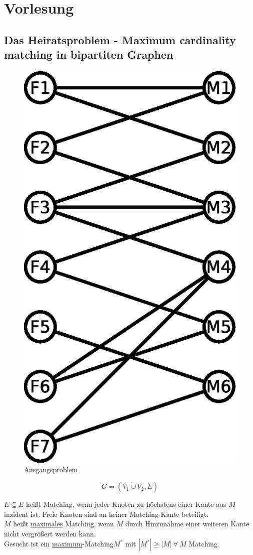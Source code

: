 \chapter{Vorlesung}
\section[Das Heiratsproblem]{Das Heiratsproblem - Maximum cardinality matching in bipartiten Graphen}
\begin{figure}
\centering
\includegraphics[width=0.5\linewidth]{23/Grafik/Diagramm1}
\caption{Ausgangsproblem}
\label{fig:Diagramm1}
\end{figure}
\[ G=(V_1 \dot{\cup}V_2, E) \]

$E \subseteq E$ heißt Matching, wenn jeder Knoten zu höchstens einer Kante aus $M$ inzident ist. Freie Knoten sind an keiner Matching-Kante beteiligt.\\

$M$ heißt \underline{maximales} Matching, wenn $M$ durch Hinzunahme einer weiteren Kante nicht vergrößert werden kann.\\

Gesucht ist ein \underline{maximum}-Matching\linebreak[4] $M^*$ mit $|M^*| \geq |M|~\forall~M$ Matching.
\vspace{80pt}

